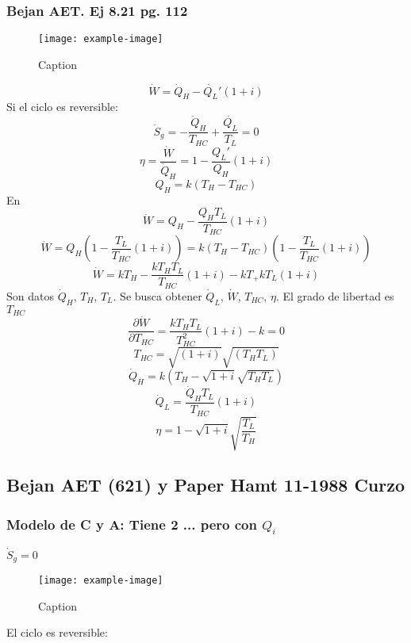 \documentclass{article}
\begin{document}
\subsubsection{Bejan AET. Ej 8.21 pg. 112}
\begin{figure}[H]
    \centering
    \texttt{[image: example-image]}
    \caption{Caption}
\end{figure}
\begin{equation}
    \dot{W}=\dot{Q}_H-\dot{Q_L}'\left(1+i\right)
\end{equation}
Si el ciclo es reversible:
\begin{equation}
    \dot{S}_g=-\frac{\dot{Q}_H}{T_{HC}}+\frac{\dot{Q_L}}{T_L}=0
\end{equation}
\begin{equation}
    \eta=\frac{\dot{W}}{\dot{Q}_H}=1-\frac{Q_L'}{Q_H}\left(1+i\right)
\end{equation}
\begin{equation}
    Q_H=k\left(T_H-T_{HC}\right)
\end{equation}
En
\begin{equation}
    \dot{W}=Q_H-\frac{Q_HT_L}{T_{HC}}\left(1+i\right)
\end{equation}
\begin{equation}
    \dot{W}=Q_H\left(1-\frac{T_L}{T_{HC}}\left(1+i\right)\right)=k\left(T_H-T_{HC}\right)\left(1-\frac{T_L}{T_{HC}}\left(1+i\right)\right)
\end{equation}
\begin{equation}
    \dot{W}=kT_H-\frac{kT_HT_L}{T_{HC}}\left(1+i\right)-kT_+kT_L\left(1+i\right)
\end{equation}
Son datos $\dot{Q}_H$, $T_H$, $T_L$. Se busca obtener $\dot{Q}_L$, $\dot{W}$, $T_{HC}$, $\eta$. El grado de libertad es $T_{HC}$
\begin{equation}
    \frac{\partial \dot{W}}{\partial T_{HC}}=\frac{kT_HT_L}{T_{HC}^2}\left(1+i\right)-k=0
\end{equation}
\begin{equation}
    T_{HC}=\sqrt{\left(1+i\right)}\sqrt{\left(T_HT_L\right)}
\end{equation}
\begin{equation}
    \dot{Q}_H=k\left(T_H-\sqrt{1+i}\sqrt{T_HT_L}\right)
\end{equation}
\begin{equation}
    \dot{Q}_L=\frac{\dot{Q}_HT_L}{T_{HC}}\left(1+i\right)
\end{equation}
\begin{equation}
    \eta=1-\sqrt{1+i}\sqrt{\frac{T_L}{T_H}}
\end{equation}
\subsection{Bejan AET (621) y Paper Hamt 11-1988 Curzo}
\subsubsection{Modelo de C y A: Tiene 2 ... pero con $Q_i$}
$\dot{S}_g=0$
\begin{figure}[H]
    \centering
    \texttt{[image: example-image]}
    \caption{Caption}
\end{figure}
El ciclo es reversible:
\begin{equation}
    
\end{equation}
\end{document}
